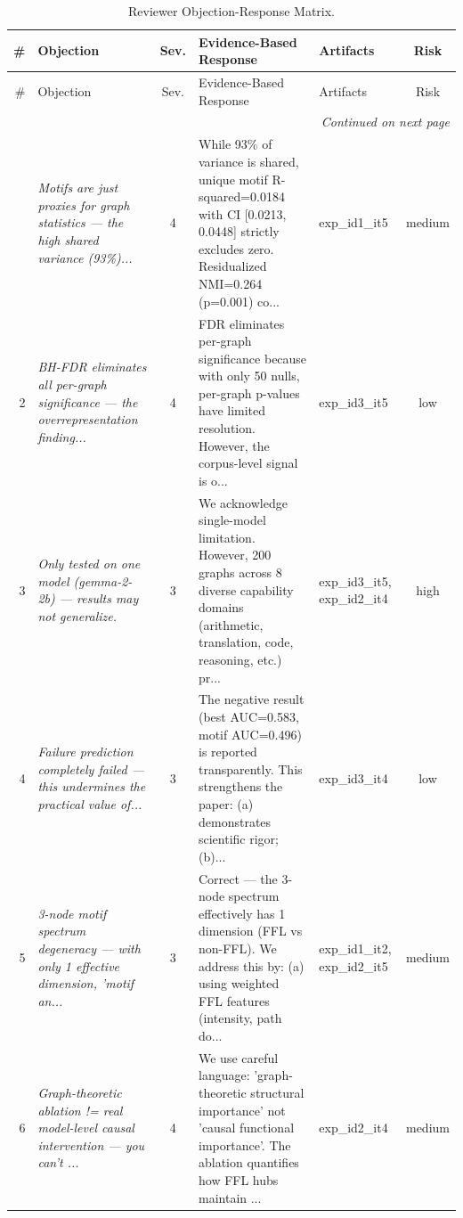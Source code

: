 \documentclass[11pt,a4paper]{article}
\begin{document}
\small
\begin{longtable}{rp{3cm}cp{5.5cm}p{2cm}c}
\caption{Reviewer Objection-Response Matrix.}\label{tab:reviewer}\\
\toprule
\# & Objection & Sev. & Evidence-Based Response & Artifacts & Risk \\
\midrule
\endfirsthead
\toprule
\# & Objection & Sev. & Evidence-Based Response & Artifacts & Risk \\
\midrule
\endhead
\midrule
\multicolumn{6}{r}{\textit{Continued on next page}} \\
\endfoot
\bottomrule
\endlastfoot
1 & \textit{Motifs are just proxies for graph statistics — the high shared variance (93\%)...} & \cellcolor{red!20}4 & While 93\% of variance is shared, unique motif R-squared=0.0184 with CI [0.0213, 0.0448] strictly excludes zero. Residualized NMI=0.264 (p=0.001) co... & exp\_id1\_it5 & \cellcolor{orange!20}medium \\
\midrule
2 & \textit{BH-FDR eliminates all per-graph significance — the overrepresentation finding...} & \cellcolor{red!20}4 & FDR eliminates per-graph significance because with only 50 nulls, per-graph p-values have limited resolution. However, the corpus-level signal is o... & exp\_id3\_it5 & \cellcolor{green!20}low \\
\midrule
3 & \textit{Only tested on one model (gemma-2-2b) — results may not generalize.} & \cellcolor{orange!20}3 & We acknowledge single-model limitation. However, 200 graphs across 8 diverse capability domains (arithmetic, translation, code, reasoning, etc.) pr... & exp\_id3\_it5, exp\_id2\_it4 & \cellcolor{red!20}high \\
\midrule
4 & \textit{Failure prediction completely failed — this undermines the practical value of...} & \cellcolor{orange!20}3 & The negative result (best AUC=0.583, motif AUC=0.496) is reported transparently. This strengthens the paper: (a) demonstrates scientific rigor; (b)... & exp\_id3\_it4 & \cellcolor{green!20}low \\
\midrule
5 & \textit{3-node motif spectrum degeneracy — with only 1 effective dimension, 'motif an...} & \cellcolor{orange!20}3 & Correct — the 3-node spectrum effectively has 1 dimension (FFL vs non-FFL). We address this by: (a) using weighted FFL features (intensity, path do... & exp\_id1\_it2, exp\_id2\_it5 & \cellcolor{orange!20}medium \\
\midrule
6 & \textit{Graph-theoretic ablation != real model-level causal intervention — you can't ...} & \cellcolor{red!20}4 & We use careful language: 'graph-theoretic structural importance' not 'causal functional importance'. The ablation quantifies how FFL hubs maintain ... & exp\_id2\_it4 & \cellcolor{orange!20}medium \\

\end{longtable}
\end{document}
